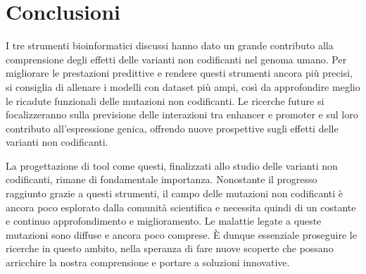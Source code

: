 
\chapter{Conclusioni}\label{chp:conclusions}

I tre strumenti bioinformatici discussi hanno dato un grande contributo alla comprensione degli effetti delle varianti non codificanti nel genoma umano. Per migliorare le prestazioni predittive e rendere questi strumenti ancora più precisi, si consiglia di allenare i modelli con dataset più ampi, così da approfondire meglio le ricadute funzionali delle mutazioni non codificanti. Le ricerche future si focalizzeranno sulla previsione delle interazioni tra enhancer e promoter e sul loro contributo all'espressione genica, offrendo nuove prospettive sugli effetti delle varianti non codificanti.

La progettazione di tool come questi, finalizzati allo studio delle varianti non codificanti, rimane di fondamentale importanza. Nonostante il progresso raggiunto grazie a questi strumenti, il campo delle mutazioni non codificanti è ancora poco esplorato dalla comunità scientifica e necessita quindi di un costante e continuo approfondimento e miglioramento. Le malattie legate a queste mutazioni sono diffuse e ancora poco comprese. È dunque essenziale proseguire le ricerche in questo ambito, nella speranza di fare nuove scoperte che possano arricchire la nostra comprensione e portare a soluzioni innovative.




